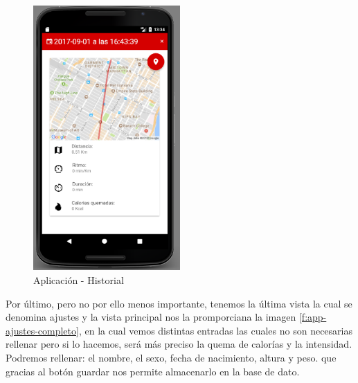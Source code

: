 \documentclass[a4paper, 11pt]{article}
\begin{document}
\begin{itemize}
              \begin{figure}[H]
               \centering
               \includegraphics[width=0.5\textwidth]{9historial-carrera}
               \caption{Aplicación - Historial}
               \label{f:app-historial-carrera}
              \end{figure}

  Por último, pero no por ello menos importante, tenemos la última vista la cual se denomina ajustes y la vista
  principal nos la promporciana la imagen \ref{f:app-ajustes-completo}, en la cual vemos distintas entradas
  las cuales no son necesarias rellenar pero si lo hacemos, será más preciso la quema de calorías y
  la intensidad. Podremos rellenar: el nombre, el sexo, fecha de nacimiento, altura y peso. que gracias al
  botón guardar nos permite almacenarlo en la base de dato.\\


\end{itemize}
\end{document}
